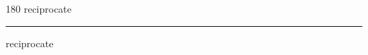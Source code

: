
\begin{frame}
\begin{center}
\begin{turn}{180}
{\fontsize{2.5cm}{1em}\selectfont reciprocate}
\end{turn}
\vspace{1em}\par  
\hrule
\vspace{1em}\par  
{\fontsize{2.5cm}{1em}\selectfont reciprocate}
\end{center}
\end{frame}
